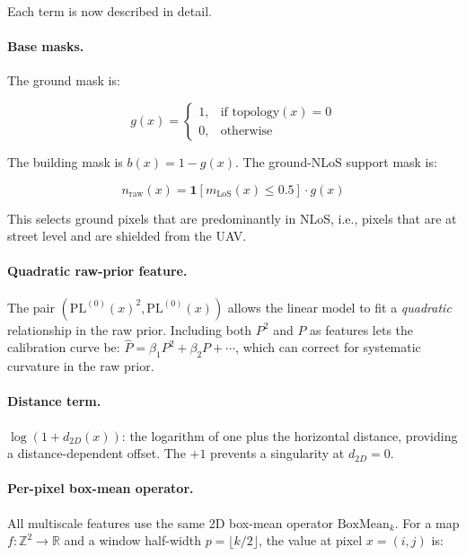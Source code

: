 \documentclass[11pt,a4paper]{article}
\begin{document}
Each term is now described in detail.

\paragraph{Base masks.}
The ground mask is:

\begin{equation}
g(x)=
\begin{cases}
1, & \text{if } \mathrm{topology}(x)=0 \\
0, & \text{otherwise}
\end{cases}
\label{eq:ground_mask}
\end{equation}

The building mask is $b(x)=1-g(x)$.
The ground-NLoS support mask is:

\begin{equation}
n_{\mathrm{raw}}(x)=
\mathbf{1}\!\left[m_{\mathrm{LoS}}(x)\le 0.5\right]\cdot g(x)
\label{eq:nlos_mask}
\end{equation}

This selects ground pixels that are predominantly in NLoS, i.e., pixels that
are at street level and are shielded from the UAV.

\paragraph{Quadratic raw-prior feature.}
The pair $(\mathrm{PL}^{(0)}(x)^2, \mathrm{PL}^{(0)}(x))$ allows the linear
model to fit a \emph{quadratic} relationship in the raw prior. Including both
$P^2$ and $P$ as features lets the calibration curve be:
$\hat P = \beta_1 P^2 + \beta_2 P + \cdots$, which can correct for
systematic curvature in the raw prior.

\paragraph{Distance term.}
$\log(1+d_{2D}(x))$: the logarithm of one plus the horizontal distance,
providing a distance-dependent offset. The $+1$ prevents a singularity at
$d_{2D}=0$.

\paragraph{Per-pixel box-mean operator.}
\label{par:boxmean}

All multiscale features use the same 2D box-mean operator
$\mathrm{BoxMean}_k$. For a map $f : \mathbb{Z}^2 \to \mathbb{R}$ and a
window half-width $p = \lfloor k/2 \rfloor$, the value at pixel
$x = (i, j)$ is:
\end{document}
